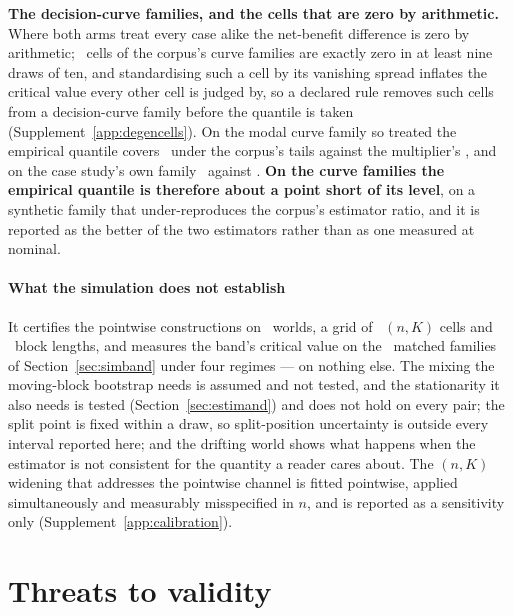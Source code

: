\documentclass[11pt,3p,review,authoryear]{elsarticle}
\theoremstyle{definition}
\begin{document}
\textbf{The decision-curve families, and the cells that are zero by
arithmetic.} Where both arms treat every case alike the net-benefit
difference is zero by arithmetic; \nDegenerateCellsDca\ cells of the
corpus's curve families are exactly zero in at least nine draws of ten, and
standardising such a cell by its vanishing spread inflates the critical value
every other cell is judged by, so a declared rule removes such cells from a
decision-curve family before the quantile is taken
(Supplement~\ref{app:degencells}). On the modal curve family so treated the
empirical quantile covers \covEmpHeavyDcaAtDesign\ under the corpus's tails
against the multiplier's \covMultHeavyDcaAtDesign, and on the case study's
own family \covEmpHeavyCaseAtDesign\ against \covMultHeavyCaseAtDesign.
\textbf{On the curve families the empirical quantile is therefore about a
point short of its level}, on a synthetic family that under-reproduces the
corpus's estimator ratio, and it is reported as the better of the two
estimators rather than as one measured at nominal.

\paragraph{What the simulation does not establish}
It certifies the pointwise constructions on \nWorlds\ worlds, a grid of
\nSimGridCells\ $(n, K)$ cells and \nSimBlockLengths\ block lengths, and
measures the band's critical value on the \nBandCoverageFamilies\ matched
families of Section~\ref{sec:simband} under four regimes --- on nothing else.
The mixing the moving-block bootstrap needs is assumed and not tested, and
the stationarity it also needs is tested (Section~\ref{sec:estimand}) and does
not hold on every pair; the split point is fixed within a draw, so
split-position uncertainty is outside every interval reported here; and the
drifting world shows what happens when the estimator is not consistent for
the quantity a reader cares about. The $(n, K)$ widening that addresses the
pointwise channel is fitted pointwise, applied simultaneously and measurably
misspecified in $n$, and is reported as a sensitivity only
(Supplement~\ref{app:calibration}).
\section{Threats to validity}
\label{sec:lim}
\end{document}
